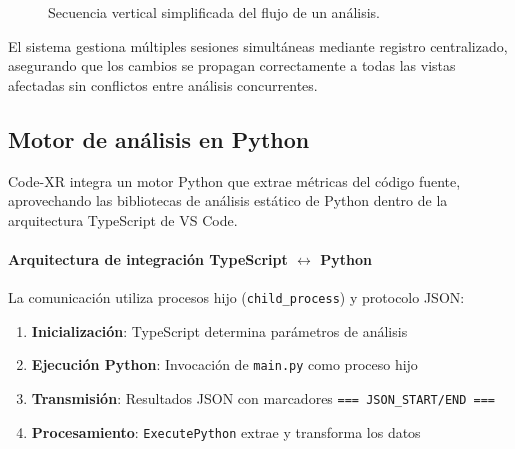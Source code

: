 \documentclass[a4paper, 12pt]{book}
\begin{document}
\begin{figure}[H]
\centering
{}
\caption{Secuencia vertical simplificada del flujo de un análisis.}
\label{fig:flujo-vertical}
\end{figure}

\noindent El sistema gestiona múltiples sesiones simultáneas mediante registro centralizado, asegurando que los cambios se propagan correctamente a todas las vistas afectadas sin conflictos entre análisis concurrentes.

\subsection{Motor de análisis en Python}
\label{sec:motor-python}

Code-XR integra un motor Python que extrae métricas del código fuente, aprovechando las bibliotecas de análisis estático de Python dentro de la arquitectura TypeScript de VS Code.

\paragraph{Arquitectura de integración TypeScript $\leftrightarrow$ Python}
La comunicación utiliza procesos hijo (\texttt{child\_process}) y protocolo JSON:
%
\begin{enumerate}
  \item \textbf{Inicialización}: TypeScript determina parámetros de análisis
  \item \textbf{Ejecución Python}: Invocación de \texttt{main.py} como proceso hijo
  \item \textbf{Transmisión}: Resultados JSON con marcadores \texttt{=== JSON\_START/END ===}
  \item \textbf{Procesamiento}: \texttt{ExecutePython} extrae y transforma los datos
\end{enumerate}
\end{document}
